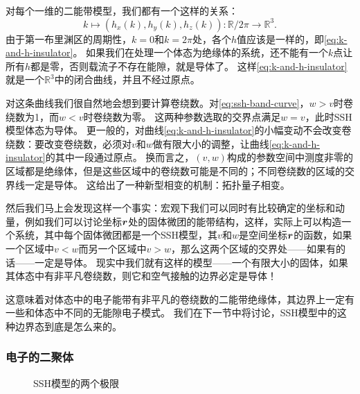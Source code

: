 对每个一维的二能带模型，我们都有一个这样的关系：
\begin{equation}
    k \mapsto (h_x(k), h_y(k), h_z(k)) : \mathbb{R} / 2 \pi \to \mathbb{R}^3.
    \label{eq:k-and-h-insulator}
\end{equation}
由于第一布里渊区的周期性，$k = 0$和$k = 2\pi$处，各个$h$值应该是一样的，即\eqref{eq:k-and-h-insulator}。
如果我们在处理一个体态为绝缘体的系统，还不能有一个$k$点让所有$h$都是零，否则载流子不存在能隙，就是导体了。
这样\eqref{eq:k-and-h-insulator}就是一个$\mathbb{R}^3$中的闭合曲线，并且不经过原点。

对这条曲线我们很自然地会想到要计算卷绕数。对\eqref{eq:ssh-band-curve}，$w > v$时卷绕数为1，而$w < v$时卷绕数为零。
这两种参数选取的交界点满足$w = v$，此时SSH模型体态为导体。
更一般的，对曲线\eqref{eq:k-and-h-insulator}的小幅变动不会改变卷绕数：要改变卷绕数，必须对$v$和$w$做有限大小的调整，让曲线\eqref{eq:k-and-h-insulator}的其中一段通过原点。
换而言之，$(v, w)$构成的参数空间中测度非零的区域都是绝缘体，但是这些区域中的卷绕数可能是不同的；不同卷绕数的区域的交界线一定是导体。
这给出了一种新型相变的机制：拓扑量子相变。

然后我们马上会发现这样一个事实：宏观下我们可以同时有比较确定的坐标和动量，例如我们可以讨论坐标$\vb*{r}$处的固体微团的能带结构，这样，实际上可以构造一个系统，其中每个固体微团都是一个SSH模型，其$v$和$w$是空间坐标$\vb*{r}$的函数，如果一个区域中$v < w$而另一个区域中$v > w$，那么这两个区域的交界处——如果有的话——一定是导体。
现实中我们就有这样的模型——一个有限大小的固体，如果其体态中有非平凡卷绕数，则它和空气接触的边界必定是导体！

这意味着对体态中的电子能带有非平凡的卷绕数的二能带绝缘体，其边界上一定有一些和体态中不同的无能隙电子模式。
我们在下一节中将讨论，SSH模型中的这种边界态到底是怎么来的。

\subsubsection{电子的二聚体}

\begin{figure}
    \centering
    \subfigure[$v=1, w= 0$，没有边界态]{
         
        \label{fig:ssh-model-trivial-limit}  
    }
    \subfigure[$w = 1, v = 0$，有边界态]{
        
        \label{fig:ssh-model-topological-limit}
    }
    \caption{SSH模型的两个极限}
\end{figure}

